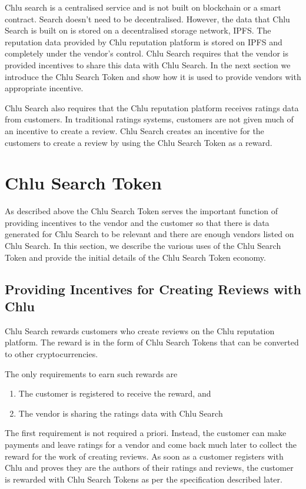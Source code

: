 \documentclass[a4paper]{article}
\begin{document}
Chlu search is a centralised service and is not built on blockchain or
a smart contract. Search doesn't need to be decentralised. However,
the data that Chlu Search is built on is stored on a decentralised
storage network, IPFS. The reputation data provided by Chlu reputation
platform is stored on IPFS and completely under the vendor's
control. Chlu Search requires that the vendor is provided incentives
to share this data with Chlu Search. In the next section we introduce
the Chlu Search Token and show how it is used to provide vendors with
appropriate incentive.

Chlu Search also requires that the Chlu reputation platform receives
ratings data from customers. In traditional ratings systems, customers
are not given much of an incentive to create a review. Chlu Search
creates an incentive for the customers to create a review by using the
Chlu Search Token as a reward.

\section{Chlu Search Token}

As described above the Chlu Search Token serves the important function
of providing incentives to the vendor and the customer so that there
is data generated for Chlu Search to be relevant and there are enough
vendors listed on Chlu Search. In this section, we describe the
various uses of the Chlu Search Token and provide the initial details
of the Chlu Search Token economy.

\subsection{Providing Incentives for Creating Reviews with Chlu}

Chlu Search rewards customers who create reviews on the Chlu
reputation platform. The reward is in the form of Chlu Search Tokens
that can be converted to other cryptocurrencies.

The only requirements to earn such rewards are

\begin{enumerate}
\item The customer is registered to receive the reward, and
\item The vendor is sharing the ratings data with Chlu Search
\end{enumerate}

The first requirement is not required a priori. Instead, the customer
can make payments and leave ratings for a vendor and come back much
later to collect the reward for the work of creating reviews. As soon
as a customer registers with Chlu and proves they are the authors of
their ratings and reviews, the customer is rewarded with Chlu Search
Tokens as per the specification described later.
\end{document}
